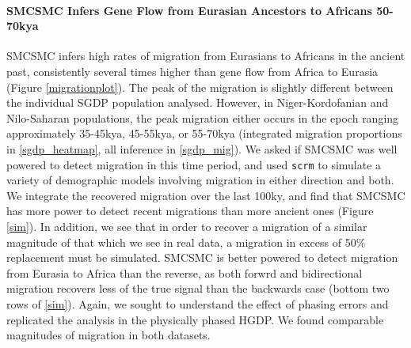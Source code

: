\documentclass{article}
\begin{document}
\paragraph{SMCSMC Infers Gene Flow from Eurasian Ancestors to Africans 50-70kya} SMCSMC infers high rates of migration from Eurasians to Africans in the ancient past, consistently several times higher than gene flow from Africa to Eurasia (Figure \ref{migrationplot}). The peak of the migration is slightly different between the individual SGDP population analysed. However, in Niger-Kordofanian and Nilo-Saharan populations, the peak migration either occurs in the epoch ranging approximately 35-45kya, 45-55kya, or 55-70kya (integrated migration proportions in \ref{sgdp_heatmap}, all inference in \ref{sgdp_mig}). We asked if SMCSMC was well powered to detect migration in this time period, and used {\tt scrm} to simulate a variety of demographic models involving migration in either direction and both. We integrate the recovered migration over the last 100ky, and find that SMCSMC has more power to detect recent migrations than more ancient ones (Figure \ref{sim}). In addition, we see that in order to recover a migration of a similar magnitude of that which we see in real data, a migration in excess of 50\% replacement must be simulated. SMCSMC is better powered to detect migration from Eurasia to Africa than the reverse, as both forwrd and bidirectional migration recovers less of the true signal than the backwards case (bottom two rows of \ref{sim}). Again, we sought to understand the effect of phasing errors and replicated the analysis in the physically phased HGDP. We found comparable magnitudes of migration in both datasets.
\end{document}
